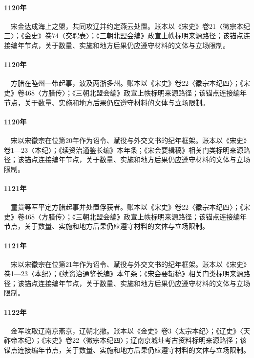 \paragraph{1120年}　宋金达成海上之盟，共同攻辽并约定燕云处置。账本以《宋史》卷21〈徽宗本纪三〉；《金史》卷74〈交聘表〉；《三朝北盟会编》政宣上帙标明来源路径；该锚点连接编年节点，关于数量、实施和地方后果仍应遵守材料的文体与立场限制。

\paragraph{1120年}　方腊在睦州一带起事，波及两浙多州。账本以《宋史》卷22〈徽宗本纪四〉；《宋史》卷468〈方腊传〉；《三朝北盟会编》政宣上帙标明来源路径；该锚点连接编年节点，关于数量、实施和地方后果仍应遵守材料的文体与立场限制。

\paragraph{1120年}　宋以宋徽宗在位第20年作为诏令、赋役与外交文书的纪年框架。账本以《宋史》卷1—23〈本纪〉；《续资治通鉴长编》本年条；《宋会要辑稿》相关门类标明来源路径；该锚点连接编年节点，关于数量、实施和地方后果仍应遵守材料的文体与立场限制。

\paragraph{1121年}　童贯等军平定方腊起事并处置俘获者。账本以《宋史》卷22〈徽宗本纪四〉；《宋史》卷468〈方腊传〉；《三朝北盟会编》政宣上帙标明来源路径；该锚点连接编年节点，关于数量、实施和地方后果仍应遵守材料的文体与立场限制。

\paragraph{1121年}　宋以宋徽宗在位第21年作为诏令、赋役与外交文书的纪年框架。账本以《宋史》卷1—23〈本纪〉；《续资治通鉴长编》本年条；《宋会要辑稿》相关门类标明来源路径；该锚点连接编年节点，关于数量、实施和地方后果仍应遵守材料的文体与立场限制。

\paragraph{1122年}　金军攻取辽南京燕京，辽朝北撤。账本以《金史》卷3〈太宗本纪〉；《辽史》〈天祚帝本纪〉；《宋史》卷22〈徽宗本纪四〉；辽南京城址考古资料标明来源路径；该锚点连接编年节点，关于数量、实施和地方后果仍应遵守材料的文体与立场限制。

